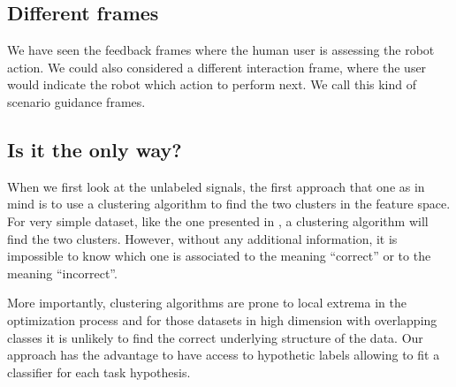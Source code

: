 

\subsection{Different frames}

We have seen the feedback frames where the human user is assessing the robot action. We could also considered a different interaction frame, where the user would indicate the robot which action to perform next. We call this kind of scenario guidance frames.



\subsection{Is it the only way?}

When we first look at the unlabeled signals, the first approach that one as in mind is to use a clustering algorithm to find the two clusters in the feature space. For very simple dataset, like the one presented in , a clustering algorithm will find the two clusters. However, without any additional information, it is impossible to know which one is associated to the meaning ``correct'' or to the meaning ``incorrect''.

More importantly, clustering algorithms are prone to local extrema in the optimization process and for those datasets in high dimension with overlapping classes it is unlikely to find the correct underlying structure of the data. Our approach has the advantage to have access to hypothetic labels allowing to fit a classifier for each task hypothesis.

